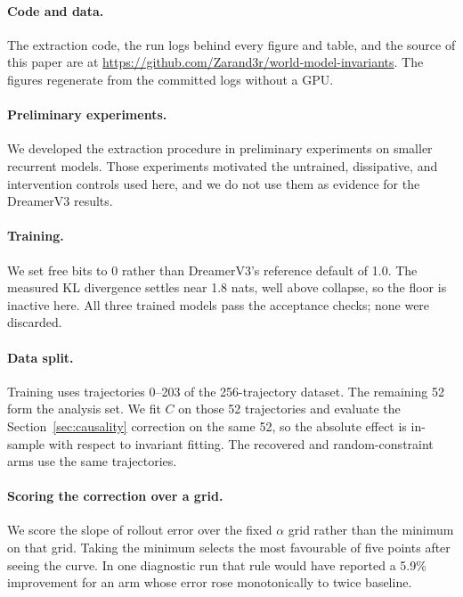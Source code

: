 \paragraph{Code and data.} The extraction code, the run logs behind every figure and table, and
the source of this paper are at \url{https://github.com/Zarand3r/world-model-invariants}. The figures
regenerate from the committed logs without a GPU.

\paragraph{Preliminary experiments.} We developed the extraction procedure in preliminary
experiments on smaller recurrent models. Those experiments motivated the untrained, dissipative, and
intervention controls used here, and we do not use them as evidence for the DreamerV3 results.

\label{sec:details}

\paragraph{Training.} We set free bits to 0 rather than DreamerV3's reference default of 1.0. The
measured KL divergence settles near 1.8 nats, well above collapse, so the floor is inactive here. All
three trained models pass the acceptance checks; none were discarded.

\paragraph{Data split.} Training uses trajectories 0--203 of the 256-trajectory dataset. The
remaining 52 form the analysis set. We fit $C$ on those 52 trajectories and evaluate the
Section~\ref{sec:causality} correction on the same 52, so the absolute effect is in-sample with
respect to invariant fitting. The recovered and random-constraint arms use the same trajectories.

\paragraph{Scoring the correction over a grid.} We score the slope of rollout error over the fixed
$\alpha$ grid rather than the minimum on that grid. Taking the minimum selects the most favourable of
five points after seeing the curve. In one diagnostic run that rule would have reported a 5.9\%
improvement for an arm whose error rose monotonically to twice baseline.

